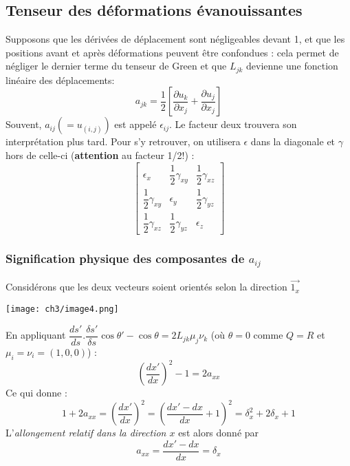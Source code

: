     \subsection{Tenseur des déformations évanouissantes}
    Supposons que les dérivées de déplacement sont négligeables devant 1, et que les positions 
    avant et après déformations peuvent être confondues : cela permet de négliger le dernier 
    terme du tenseur de Green et que $L_{jk}$ devienne une fonction linéaire des déplacements:
    \begin{equation}
    a_{jk} = \frac{1}{2}\left[\dfrac{\partial u_k}{\partial x_j}+
    \dfrac{\partial u_j}{\partial x_j}\right]
    \end{equation}
    Souvent, $a_{ij} (= u_{(i,j)})$ est appelé $\epsilon_{ij}$. Le facteur deux trouvera son 
    interprétation plus tard. Pour s'y retrouver, on utilisera $\epsilon$ dans la diagonale et
    $\gamma$ hors de celle-ci (\textbf{attention} au facteur 1/2!) :
    \begin{equation}
    \left[\begin{array}{ccc}
    \epsilon_x & \dfrac{1}{2}\gamma_{xy} & \dfrac{1}{2}\gamma_{xz}\\
    \dfrac{1}{2}\gamma_{xy} & \epsilon_{y} & \dfrac{1}{2}\gamma_{yz}\\
    \dfrac{1}{2}\gamma_{xz} & \dfrac{1}{2}\gamma_{yz} & \epsilon_{z}
    \end{array}\right]
    \end{equation}
    
        \subsubsection{Signification physique des composantes de $a_{ij}$}
        Considérons que les deux vecteurs soient orientés selon la direction $\vec{1_x}$
        \begin{center}
        \texttt{[image: ch3/image4.png]}
        \end{center}
        
        En appliquant $\dfrac{ds'}{ds}.\dfrac{\delta s'}{\delta s}\cos\theta' - \cos\theta
        = 2L_{jk}\mu_j\nu_k$ (où $\theta = 0$ comme $Q=R$ et $\mu_i = \nu_i = (1,0,0)$) :
        \begin{equation}
        \left(\dfrac{dx'}{dx}\right)^2 - 1 = 2a_{xx}
        \end{equation}
        Ce qui donne :
        \begin{equation}
        1 + 2a_{xx} = \left(\dfrac{dx'}{dx}\right)^2 = \left(\dfrac{dx'-dx}{dx}+1\right)^2
        = \delta_x^2 + 2\delta_x + 1
        \end{equation}
        L'\textit{allongement relatif dans la direction $x$} est alors donné par 
        \begin{equation}
        a_{xx} = \dfrac{dx'-dx}{dx} = \delta_x
        \end{equation}
        
